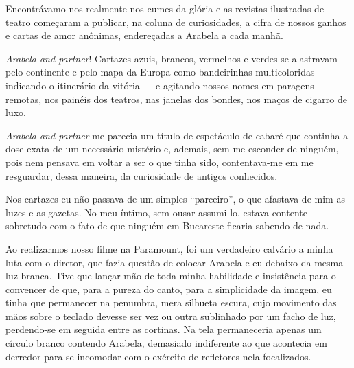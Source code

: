 Encontrávamo-nos realmente nos cumes da glória e as revistas ilustradas
de teatro começaram a publicar, na coluna de curiosidades, a cifra de
nossos ganhos e cartas de amor anônimas, endereçadas a Arabela a cada
manhã.

\emph{Arabela and partner}! Cartazes azuis, brancos, vermelhos e
verdes se alastravam pelo continente e pelo mapa da Europa como
bandeirinhas multicoloridas indicando o itinerário da vitória --- e
agitando nossos nomes em paragens remotas, nos painéis dos teatros, nas
janelas dos bondes, nos maços de cigarro de luxo.


\emph{Arabela and partner} me parecia um título de espetáculo de
cabaré que continha a dose exata de um necessário mistério e, ademais,
sem me esconder de ninguém, pois nem pensava em voltar a ser o que tinha
sido, contentava-me em me resguardar, dessa maneira, da curiosidade de
antigos conhecidos.

Nos cartazes eu não passava de um simples ``parceiro'', o que afastava
de mim as luzes e as gazetas. No meu íntimo, sem ousar assumi-lo, estava
contente sobretudo com o fato de que ninguém em Bucareste ficaria
sabendo de nada.


Ao realizarmos nosso filme na Paramount, foi um verdadeiro calvário a
minha luta com o diretor, que fazia questão de colocar Arabela e eu
debaixo da mesma luz branca. Tive que lançar mão de toda minha
habilidade e insistência para o convencer de que, para a pureza do
canto, para a simplicidade da imagem, eu tinha que permanecer na
penumbra, mera silhueta escura, cujo movimento das mãos sobre o teclado devesse ser vez ou outra sublinhado por um facho de luz, perdendo-se em seguida
entre as cortinas. Na tela permaneceria apenas um círculo branco
contendo Arabela, demasiado indiferente ao que acontecia em derredor
para se incomodar com o exército de refletores nela focalizados.


